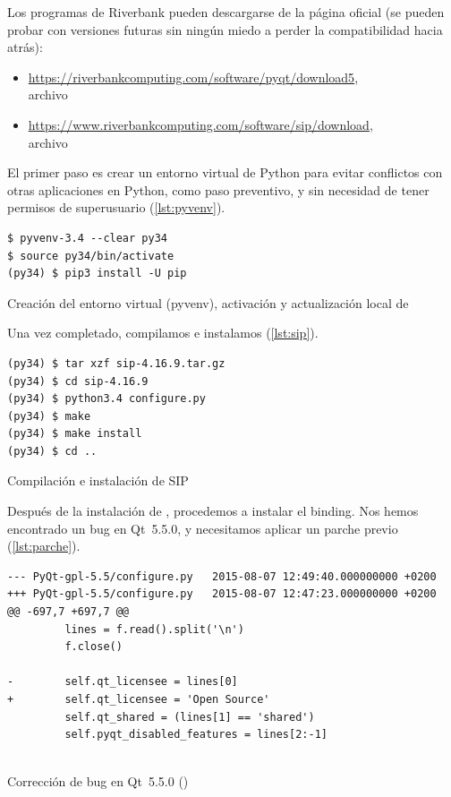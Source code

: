 Los programas de Riverbank pueden descargarse de la página oficial (se pueden probar con versiones futuras sin ningún miedo a perder la compatibilidad hacia atrás):
\begin{itemize}
\item \url{https://riverbankcomputing.com/software/pyqt/download5},\\
archivo 
\item \url{https://www.riverbankcomputing.com/software/sip/download},\\
archivo 
\end{itemize}

El primer paso es crear un entorno virtual de Python para evitar conflictos con otras aplicaciones en Python, como paso preventivo, y sin necesidad de tener permisos de superusuario (\autoref{lst:pyvenv}).

\begin{listing}[htbp]
\begin{verbatim}
$ pyvenv-3.4 --clear py34
$ source py34/bin/activate
(py34) $ pip3 install -U pip
\end{verbatim}
\caption[Creación del entorno virtual (pyvenv)]{Creación del entorno virtual (pyvenv), activación y actualización local de }
\label{lst:pyvenv}
\end{listing}
\FloatBarrier

Una vez completado, compilamos e instalamos  (\autoref{lst:sip}).

\begin{listing}[htbp]
\begin{verbatim}
(py34) $ tar xzf sip-4.16.9.tar.gz
(py34) $ cd sip-4.16.9
(py34) $ python3.4 configure.py
(py34) $ make
(py34) $ make install
(py34) $ cd ..
\end{verbatim}
\caption{Compilación e instalación de SIP}
\label{lst:sip}
\end{listing}
\FloatBarrier

Después de la instalación de , procedemos a instalar el binding. Nos hemos encontrado un bug en Qt~5.5.0, y necesitamos aplicar un parche previo (\autoref{lst:parche}).

\begin{listing}[htbp]
\begin{verbatim}
--- PyQt-gpl-5.5/configure.py   2015-08-07 12:49:40.000000000 +0200
+++ PyQt-gpl-5.5/configure.py   2015-08-07 12:47:23.000000000 +0200
@@ -697,7 +697,7 @@
         lines = f.read().split('\n')
         f.close()
 
-        self.qt_licensee = lines[0]
+        self.qt_licensee = 'Open Source'
         self.qt_shared = (lines[1] == 'shared')
         self.pyqt_disabled_features = lines[2:-1]
 
\end{verbatim}
\caption[Corrección de bug en Qt~5.5.0]{Corrección de bug en Qt~5.5.0 ()}
\label{lst:parche}
\end{listing}
\FloatBarrier

